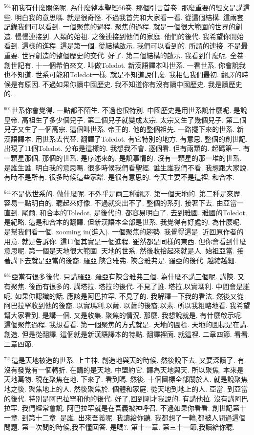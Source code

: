 \documentclass{book}
\begin{document}
$^{561}$和我有什麼關係呢.
為什麼整本聖經66卷.
那個引言首卷.
那麼重要的經文是講這些.
明白我的意思嗎.
就是很奇怪.
不過我首先和大家看一看.
從這個結構.
這兩套記錄我們可以看到.
一個聚焦的過程.
聚焦的過程.
就是一個很大範圍的世界的創造.
慢慢連接到.
人類的始祖.
之後連接到他們的家庭.
他們的後代.
我希望你開始看到.
這樣的進程.
這是第一個.
從結構啟示.
我們可以看到的.
所謂的連接.
不是最重要.
世界創造的整個歷史的交代.
好了.
第二個結構的啟示.
我看到什麼呢.
全卷創世記有.
十一個希伯來文.
叫做Toledot.
新漢語譯本叫世系.
一看世系.
你會說我也不知道.
世系可能和Toledot一樣.
就是不知道說什麼.
我相信我們最初.
翻譯的時候是有原因.
不過如果你讀中國歷史.
我不知道你有沒有讀中國歷史.
我是讀歷史的.

$^{601}$世系你會覺得.
一點都不陌生.
不過也很特別.
中國歷史是用世系說什麼呢.
是說皇帝.
高祖生了多少個兒子.
第二個兒子就變成太宗.
太宗又生了幾個兒子.
第二個兒子又生了一個高宗.
這個叫世系.
帝王的.
他的整個祖先.
一路擺下來的世系.
新漢語譯本.
用世系去代替.
翻譯了Toledot.
有它特別的地方.
有意思.
整個的創世記.
出現了11個Toledot.
分布是這樣的.
我想我不會.
逐個看.
但有兩類的.
起碼第一.
有一顆星那個.
那個的世系.
是序述來的.
是說事情的.
沒有一顆星的那一堆的世系.
是誰生誰.
明白我的意思嗎.
很多時候我們看聖經.
誰生誰我們不看.
我想跟大家說.
有時不是所有.
很多時候這些家譜.
是很有意思的.
今天主要不是這裡.
和合本.

$^{641}$不是做世系的.
做什麼呢.
不外乎是兩三種翻譯.
第一個天地的.
第二種是來歷.
容易一點明白的.
聽起來好像.
不過就突出不了.
整個的系列.
接著下去.
由亞當一直到.
尾爾.
和合本的Toledot.
是後代的.
都容易明白了.
去到雅國.
雅國的Toledot.
是紀略.
這是和合本的翻譯.
但新漢語本全部是世系.
我覺得有好處的.
為什麼呢.
是幫我們看一個.
zooming in(進入).
一個聚焦的趨勢.
我覺得這是.
近回原作者的用意.
就是告訴你.
這11個其實是一個進程.
雖然都是同樣的東西.
但你會看到什麼意思呢.
第一個是天地很大範圍.
天地的世系.
然後收拾起來就是人.
始祖亞當.
接著講下去就是亞當的後裔.
羅亞,陝含雅弗.
陝含雅弗是.
羅亞的後代.
越縮越細.

$^{681}$亞當有很多後代.
只講羅亞.
羅亞有陝含雅弗三個.
為什麼不講三個呢.
講陝.
又有聚焦.
後面有很多的.
講塔拉.
塔拉的後代.
不見了誰.
塔拉,以實瑪利.
中間會是誰呢.
如果你認識的話.
應該是阿巴拉罕.
不見了的.
我解釋一下我的看法.
然後又從阿巴拉罕收到他的後裔.
以實瑪利,以薩.
以薩的後裔,以素.
所以我粗略地看.
我希望幫大家看到.
是講一個.
又是收集.
聚焦的情況.
那麼.
我想說就是.
有什麼啟示呢.
這個聚焦過程.
我想看看.
第一個聚焦的方式就是.
天地的圖標.
天地的圖標是在講.
創造.
但是從翻譯.
這個就是新漢語譯本的特點.
翻譯裡面.
就這裡.
二章四節.
看看.
二章四節.

$^{721}$這是天地被造的世系.
上主神.
創造地與天的時候.
然後說下去.
又要深讀了.
有沒有發覺有一個轉折.
在講的是天地.
中盟約它.
譯為天地與天.
所以聚焦.
本來是天地萬物.
現在聚焦在地.
下來了.
看到嗎.
然後.
十個圖標全部關於人.
就是說聚焦地之後.
聚焦地上的人.
然後聚焦於.
個體和家庭.
從天地到地上的人.
亞當.
到亞當的後代.
特別是阿巴拉罕和他的後代.
好了,回到剛才我說的.
有講他拉.
沒有講阿巴拉罕.
我們經常會說.
阿巴拉罕就是在吾義被神呼召.
不過如果你看看.
創世記第十一章.
到第十二章.
是誰.
出來吾義呢.
我讀給你聽.
我都想了一輪,都被人問過這個問題.
第一次問的時候,我不懂回答.
是嗎?.
第十一章.
第三十一節,我讀給你聽.
\end{document}
